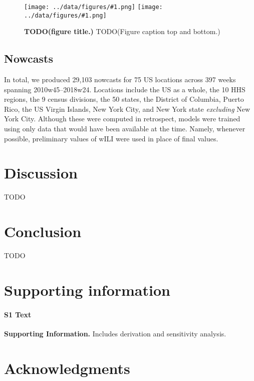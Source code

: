 \documentclass[10pt,letterpaper]{article}
\newcommand{\maybeincludegraphics}[1]{\texttt{[image: ../data/figures/\#1.png]}}
\begin{document}
\begin{figure}[!h]
  \maybeincludegraphics{sensor_heatmap_top}
  \maybeincludegraphics{sensor_heatmap_bottom}
  \caption{
    {\bf TODO(figure title.)}
    TODO(Figure caption top and bottom.)
  }
  \label{figure_sensor_heatmap}
\end{figure}

\subsection*{Nowcasts}


In total, we produced 29,103 nowcasts for 75 US locations across 397 weeks
spanning 2010w45--2018w24. Locations include the US as a whole, the 10 HHS
regions, the 9 census divisions, the 50 states, the District of Columbia,
Puerto Rico, the US Virgin Islands, New York City, and New York state
\textit{excluding} New York City. Although these were computed in retrospect,
models were trained using only data that would have been available at the time.
Namely, whenever possible, preliminary values of wILI were used in place of
final values.

\section*{Discussion}

TODO

\section*{Conclusion}

TODO

\section*{Supporting information}

\paragraph*{S1 Text}
\label{S1_Text}
{\bf Supporting Information.} Includes derivation and sensitivity analysis.

\section*{Acknowledgments}
\end{document}
